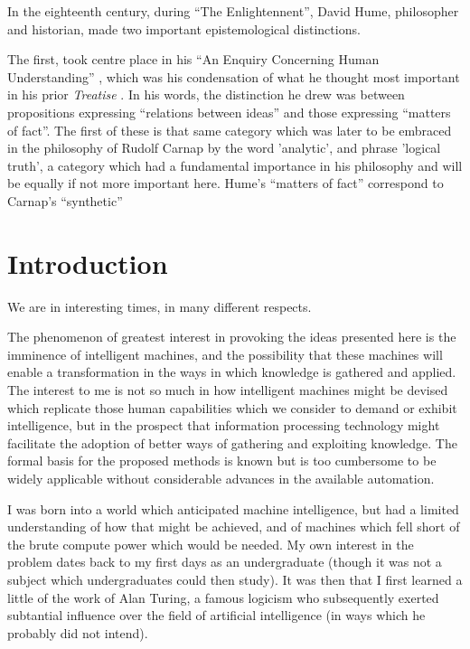 \documentclass[10pt,titlepage]{book}
\begin{document}
In the eighteenth century, during ``The Enlightennent'', David Hume, philosopher and historian, made two important epistemological distinctions.

The first, took centre place in his ``An Enquiry Concerning Human Understanding'' \cite{hume48}, which was his condensation of what he thought most important in his prior \emph{Treatise} \cite{hume39}.
In his words, the distinction he drew was between propositions expressing ``relations between ideas'' and those expressing ``matters of fact''.
The first of these is that same category which was later to be embraced in the philosophy of Rudolf Carnap by the word 'analytic', and phrase 'logical truth', a category which had a fundamental importance in his philosophy and will be equally if not more important here.
Hume's ``matters of fact'' correspond to Carnap's ``synthetic'' 

\chapter{Introduction}

We are in interesting times, in many different respects.

The phenomenon of greatest interest in provoking the ideas presented here is the imminence of intelligent machines, and the possibility that these machines will enable a transformation in the ways in which knowledge is gathered and applied.
The interest to me is not so much in how intelligent machines might be devised which replicate those human capabilities which we consider to demand or exhibit intelligence, but in the prospect that information processing technology might facilitate the adoption of better ways of gathering and exploiting knowledge.
The formal basis for the proposed methods is known but is too cumbersome to be widely applicable without considerable advances in the available automation.

I was born into a world which anticipated machine intelligence, but had a limited understanding of how that might be achieved, and of machines which fell short of the brute compute power which would be needed. 
My own interest in the problem dates back to my first days as an undergraduate (though it was not a subject which undergraduates could then study).
It was then that I first learned a little of the work of Alan Turing, a famous logicism who subsequently exerted subtantial influence over the field of artificial intelligence (in ways which he probably did not intend).
\end{document}
